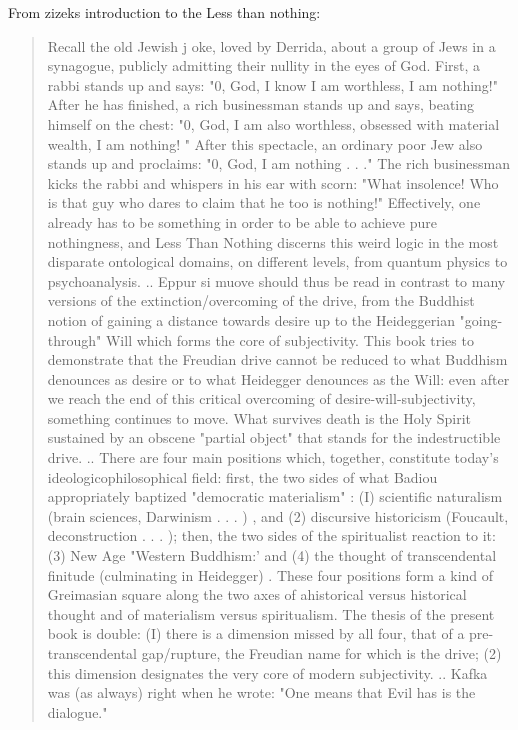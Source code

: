 \documentclass[10pt]{book}
\begin{document}
From zizeks introduction to the Less than nothing:
\begin{quotation}
Recall the old Jewish j oke, loved by Derrida, about a group of Jews in a synagogue, publicly admitting their nullity in the eyes of God. First, a rabbi stands up and says: "0, God, I know I am worthless, I am nothing!" After he has finished, a rich businessman stands up and says, beating himself on the chest: "0, God, I am also worthless, obsessed with material wealth, I am nothing! " After this spectacle, an ordinary poor Jew also stands up and proclaims: "0, God, I am nothing . . ." The rich businessman kicks the rabbi and whispers in his ear with scorn: "What insolence! Who is that guy who dares to claim that he too is nothing!" Effectively, one already has to be something in order to be able to achieve pure nothingness, and Less Than Nothing discerns this weird logic in the most disparate ontological domains, on different levels, from quantum physics to psychoanalysis.
..
Eppur si muove should thus be read in contrast to many versions of the extinction/overcoming of the drive, from the Buddhist notion of gaining a distance towards desire up to the Heideggerian "going-through" Will which forms the core of subjectivity. This book tries to demonstrate that the Freudian drive cannot be reduced to what Buddhism denounces as desire or to what Heidegger denounces as the Will: even after we reach the end of this critical overcoming of desire-will-subjectivity, something continues to move. What survives death is the Holy Spirit sustained by an obscene "partial object" that stands for the indestructible drive.
..
There are four main positions which, together, constitute today's ideologico­philosophical field: first, the two sides of what Badiou appropriately baptized "democratic materialism" : (I) scientific naturalism (brain sciences, Darwinism . . . ) , and (2) discursive historicism (Foucault, deconstruction . . . ); then, the two sides of the spiritualist reaction to it: (3) New Age "Western Buddhism:' and (4) the thought of transcendental finitude (culminating in Heidegger) . These four positions form a kind of Greimasian square along the two axes of ahistorical versus historical thought and of materialism versus spiritualism. The thesis of the present book is double: (I) there is a dimension missed by all four, that of a pre-transcendental gap/rupture, the Freudian name for which is the drive; (2) this dimension designates the very core of modern subjectivity.
..
Kafka was (as always) right when he wrote: "One means that Evil has is the dialogue."

\end{quotation}
\end{document}

